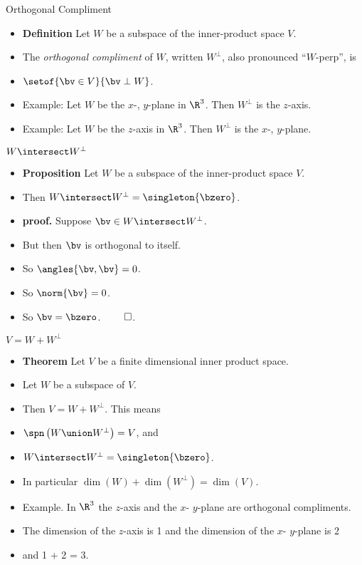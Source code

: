 \documentclass{beamer}
\begin{document}
\begin{frame}{Orthogonal Compliment}
\begin{itemize}
\item \textbf{Definition} Let $W$ be a subspace of the inner-product space $V$.
\item The \emph{orthogonal compliment} of $W$, written $W^{\perp}$, also pronounced ``$W$-perp'', is
\item $\setof{\bv\in V}{\bv\perp W}$.
\item Example: Let $W$ be the $x$-, $y$-plane in $\R^3$. Then $W^{\perp}$ is the $z$-axis.
\item Example: Let $W$ be the $z$-axis in $\R^3$. Then $W^{\perp}$ is the $x$-, $y$-plane.
\end{itemize}
\end{frame}

\begin{frame}{$W\intersect W^{\perp}$}
\begin{itemize}
\item \textbf{Proposition} Let $W$ be a subspace of the inner-product space $V$.
\item Then $W\intersect W^{\perp} = \singleton{\bzero}$.
\item \textbf{proof.} Suppose $\bv\in W\intersect W^{\perp}$.
\item But then $\bv$ is orthogonal to itself.
\item So $\angles{\bv,\bv} = 0$.
\item So $\norm{\bv} = 0$.
\item So $\bv=\bzero$. $\qed$.
\end{itemize}
\end{frame}

\begin{frame}{$V=W+W^{\perp}$}
\begin{itemize}
\item \textbf{Theorem} Let $V$ be a finite dimensional inner product space.
\item Let $W$ be a subspace of $V$.
\item Then $V= W + W^{\perp}$. This means
\item $\spn\left(W\union W^{\perp}\right) = V$, and
\item $W\intersect W^{\perp} = \singleton{\bzero}$.
\item In particular $\dim(W) + \dim(W^{\perp}) = \dim(V)$.
\item Example. In $\R^3$ the $z$-axis and the $x$- $y$-plane are orthogonal compliments.
\item The dimension of the $z$-axis is 1 and the dimension of the $x$- $y$-plane is 2
\item and 1 + 2 = 3.
\end{itemize}
\end{frame}
\end{document}
